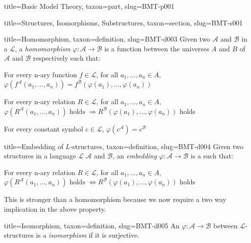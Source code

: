 \documentclass[a4paper]{article}
\begin{document}
\begin{tree}{title={Basic Model Theory}, taxon={part}, slug={BMT-p001}}
\begin{tree}{title={Structures, Isomorphisms, Substructures}, taxon={section}, slug={BMT-s001}}
\begin{tree}{title={Homomorphism}, taxon={definition}, slug={BMT-d003}}
Given two  \(\mathcal {A}\) and \(\mathcal {B}\) in a  \(\mathcal {L}\), a \emph{homomorphism} \(\varphi :  \mathcal {A}  \rightarrow   \mathcal {B}\)
is a function between the universes \(A\) and \(B\) of \(\mathcal {A}\) and \(\mathcal {B}\) respectively such that:\par{ For every n-ary function \(f \in   \mathcal {L}\), for all \(a_1, \dots , a_n \in  A\), \(\varphi (f^{ \mathcal {A}}(a_1, \dots , a_n)) = f^{ \mathcal {B}}( \varphi (a_1), \dots ,  \varphi (a_n))\)}\par{For every n-ary relation \(R \in   \mathcal {L}\), for all \(a_1, \dots , a_n  \in  A\), \(\varphi (R^{ \mathcal {A}}(a_1, \dots , a_n))  \text { holds }  \Rightarrow  R^{ \mathcal {B}}( \varphi (a_1),  \dots ,  \varphi (a_n))\) holds}\par{For every constant symbol \(c  \in   \mathcal {L}\), \(\varphi (c^{ \mathcal {A}}) =c^{ \mathcal {B}}\)}
\end{tree}

\begin{tree}{title={Embedding of \(L\)-structures}, taxon={definition}, slug={BMT-d004}}
Given two structures in a language \(\mathcal {L}\) \(\mathcal {A}\) and \(\mathcal {B}\), an \emph{embedding} \(\varphi :  \mathcal {A}  \rightarrow   \mathcal {B}\)
is a  such that:\par{For every n-ary relation \(R \in   \mathcal {L}\), for all \(a_1, \dots , a_n  \in  A\), \(\varphi (R^{ \mathcal {A}}(a_1, \dots , a_n))  \text { holds }  \Leftrightarrow  R^{ \mathcal {B}}( \varphi (a_1),  \dots ,  \varphi (a_n))\) holds}\par{This is stronger than a homomorphism because we now require a two way implication in the above property.}
\end{tree}

\begin{tree}{title={Isomorphism}, taxon={definition}, slug={BMT-d005}}
An  \(\varphi :  \mathcal {A}  \rightarrow   \mathcal {B}\) between \(\mathcal {L}\)-structures is a \emph{isomorphism} if it is surjective.
\end{tree}


\end{tree}
\end{tree}
\end{document}
